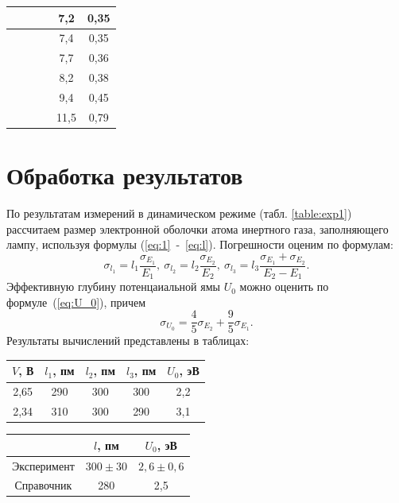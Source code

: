 \documentclass[a4paper,12pt]{article} %
\begin{document}
\begin{table}[H]
\begin{tabular}{|c|c|c|c|c|c|}
				&               &              &               & 7,2          & 0,35          \\ \hline
				&               &              &               & 7,4          & 0,35          \\ \hline
				&               &              &               & 7,7          & 0,36          \\ \hline
				&               &              &               & 8,2          & 0,38          \\ \hline
				&               &              &               & 9,4          & 0,45          \\ \hline
				&               &              &               & 11,5         & 0,79          \\ \hline
			\end{tabular}
		\end{table}
	
	\newpage
	\section{Обработка результатов}
		По результатам измерений в динамическом режиме (табл. \ref{table:exp1}) рассчитаем размер электронной оболочки атома инертного газа, заполняющего лампу, используя формулы (\ref{eq:1}~-~\ref{eq:l}). Погрешности оценим по формулам:
		\begin{equation*}
			\sigma_{l_1} = l_1 \frac{\sigma_{E_1}}{E_1}, \ \sigma_{l_2} = l_2 \frac{\sigma_{E_2}}{E_2}, \ \sigma_{l_3} = l_3 \frac{\sigma_{E_1}+\sigma_{E_2}}{E_2-E_1}.
		\end{equation*}
		Эффективную глубину потенцаиальной ямы $U_0$ можно оценить по формуле~(\ref{eq:U_0}), причем
		\begin{equation*}
			\sigma_{U_0} = \frac{4}{5}\sigma_{E_2}+\frac{9}{5}\sigma_{E_1}.
		\end{equation*}
		Результаты вычислений представлены в таблицах:
		\begin{table}[h!]
			\begin{floatrow}
				{\begin{tabular}{|c|c|c|c|c|}
						\hline
						$V$, В & $l_1$, пм & $l_2$, пм & $l_3$, пм & $U_0$, эВ \\ \hline
						2,65   & 290       & 300       & 300       & 2,2       \\ \hline
						2,34   & 310       & 300       & 290       & 3,1       \\ \hline
				\end{tabular}}
				{\begin{tabular}{|c|c|c|}
						\hline
						& $l$, пм        & $U_0$, эВ     \\ \hline
						Эксперимент & $300 \pm 30$ & $2,6 \pm 0,6$ \\ \hline
						Справочник  & 280          & 2,5           \\ \hline
				\end{tabular}}        
			\end{floatrow}
		\end{table}
	
\end{document}
